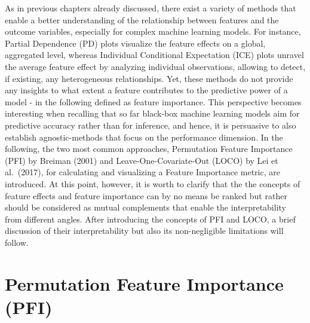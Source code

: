 \documentclass[
]{krantz}
\begin{document}
As in previous chapters already discussed, there exist a variety of methods that enable a better understanding of the relationship between features and the outcome variables, especially for complex machine learning models. For instance, Partial Dependence (PD) plots visualize the feature effects on a global, aggregated level, whereas Individual Conditional Expectation (ICE) plots unravel the average feature effect by analyzing individual observations, allowing to detect, if existing, any heterogeneous relationships. Yet, these methods do not provide any insights to what extent a feature contributes to the predictive power of a model - in the following defined as feature importance. This perspective becomes interesting when recalling that so far black-box machine learning models aim for predictive accuracy rather than for inference, and hence, it is persuasive to also establish agnostic-methods that focus on the performance dimension. In the following, the two most common approaches, Permutation Feature Importance (PFI) by Breiman (2001) and Leave-One-Covariate-Out (LOCO) by Lei et al.~(2017), for calculating and visualizing a Feature Importance metric, are introduced. At this point, however, it is worth to clarify that the the concepts of feature effects and feature importance can by no means be ranked but rather should be considered as mutual complements that enable the interpretability from different angles. After introducing the concepts of PFI and LOCO, a brief discussion of their interpretability but also its non-negligible limitations will follow.

\hypertarget{permutation-feature-importance-pfi}{%
\section{Permutation Feature Importance (PFI)}\label{permutation-feature-importance-pfi}}
\end{document}
